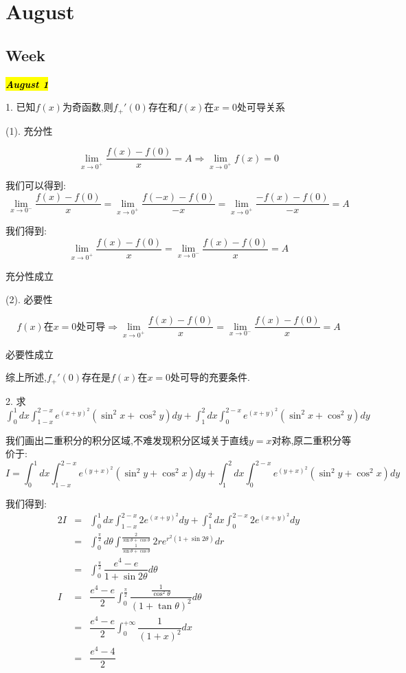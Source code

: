 \chapter{August}
\section{Week }
\hl{\textbf{\textit{August 1}}}

1. 已知$f(x)$为奇函数,则$f_{+}'(0)$存在和$f(x)$在$x=0$处可导关系
\begin{solution}
	
	(1). 充分性
	
	$$\lim\limits_{x\rightarrow 0^{+}}\dfrac{f(x)-f(0)}{x}=A\Rightarrow \lim\limits_{x\rightarrow 0^{+}}f(x)=0$$
	
	我们可以得到: 
	$$\lim\limits_{x\rightarrow 0^{-}}\dfrac{f(x)-f(0)}{x}=\lim\limits_{x\rightarrow 0^{+}}\dfrac{f(-x)-f(0)}{-x}=\lim\limits_{x\rightarrow 0^{+}}\dfrac{-f(x)-f(0)}{-x}=A$$
	
	我们得到: $$\lim\limits_{x\rightarrow 0^{+}}\dfrac{f(x)-f(0)}{x}=\lim\limits_{x\rightarrow 0^{-}}\dfrac{f(x)-f(0)}{x}=A$$
	
	充分性成立
	
	(2). 必要性
	
	$$f(x)\text{在}x=0\text{处可导}\Rightarrow \lim\limits_{x\rightarrow 0^{+}}\dfrac{f(x)-f(0)}{x}=\lim\limits_{x\rightarrow 0^{-}}\dfrac{f(x)-f(0)}{x}=A$$
	
	必要性成立
	
	综上所述,$f_{+}'(0)$存在是$f(x)$在$x=0$处可导的充要条件.
\end{solution} 

2. 求$\int_{0}^{1}dx\int_{1-x}^{2-x}e^{(x+y)^2}(\sin^2x+\cos^2y)dy+\int_{1}^{2}dx\int_{0}^{2-x}e^{(x+y)^2}(\sin^2x+\cos^2y)dy$
\begin{solution}
	
	我们画出二重积分的积分区域,不难发现积分区域关于直线$y=x$对称,原二重积分等价于: 
	$$I=\int_{0}^{1}dx\int_{1-x}^{2-x}e^{(y+x)^2}(\sin^2y+\cos^2x)dy+\int_{1}^{2}dx\int_{0}^{2-x}e^{(y+x)^2}(\sin^2y+\cos^2x)dy$$
	
	我们得到: 
	\begin{eqnarray*}
		2I&=&\int_{0}^{1}dx\int_{1-x}^{2-x}2e^{(x+y)^2}dy+\int_{1}^{2}dx\int_{0}^{2-x}2e^{(x+y)^2}dy\\
		&=&\int_{0}^{\frac{\pi}{2}}d\theta\int_{\frac{1}{\sin\theta+\cos\theta}}^{\frac{2}{\sin\theta+\cos\theta}}2re^{r^2(1+\sin 2\theta)}dr\\
		&=&\int_{0}^{\frac{\pi}{2}}\dfrac{e^4-e}{1+\sin2\theta}d\theta\\
		I&=&\dfrac{e^4-e}{2}\int_{0}^{\frac{\pi}{2}}\dfrac{\frac{1}{\cos^2\theta}}{(1+\tan\theta)^2}d\theta\\
		&=&\dfrac{e^4-e}{2}\int_{0}^{+\infty}\dfrac{1}{(1+x)^2}dx\\
		&=&\dfrac{e^4-4}{2}
	\end{eqnarray*}
\end{solution}

